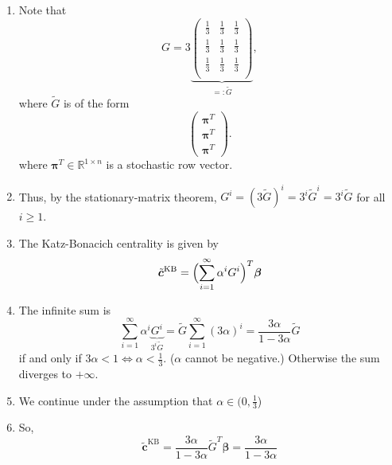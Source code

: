 \begin{parts}
    \begin{solutionorbox}[\boxheight{20}]
        \begin{enumerate}
            \item   Note that 
        \begin{equation*}
            G = 3 \underbrace{\begin{pmatrix}
                \frac{1}{3} & \frac{1}{3} & \frac{1}{3} \\
                \frac{1}{3} & \frac{1}{3} & \frac{1}{3} \\
                \frac{1}{3} & \frac{1}{3} & \frac{1}{3} \\
            \end{pmatrix}}_{=: \tilde G},
        \end{equation*}
        where $\tilde G$ is of the form \begin{equation*}
            \begin{pmatrix}
                \bm \pi^T \\ \bm \pi^T \\ \bm \pi^T
            \end{pmatrix}.
        \end{equation*}
        where $\bm \pi^T \in \mathbb{R}^{1 \times n}$ is a stochastic row vector. 
        \item Thus, by the stationary-matrix theorem, $G^i = (3 \tilde G)^i = 3^i \tilde G^i = 3^i \tilde G$ for all $i \geq 1$.
        \item The Katz-Bonacich centrality is given by \begin{equation*}
            \tilde{\bm c}^{\text{KB}} = \Bigl(\sum_{i=1}^\infty \alpha^i G^i\Bigr)^T \bm \beta
        \end{equation*}
        \item The infinite sum is
        \begin{equation*}
            \sum_{i=1}^\infty \alpha^i \underbrace{G^i}_{3^i \tilde G} = \tilde G \sum_{i = 1}^\infty (3\alpha)^i = \frac{3\alpha}{1-3\alpha} \tilde G
        \end{equation*}
        if and only if $3\alpha < 1 \iff \alpha < \frac{1}{3}$. ($\alpha$ cannot be negative.) Otherwise the sum diverges to $+\infty$.
        \item We continue under the assumption that $\alpha \in (0, \frac{1}{3}$)
        \item So, 
        \begin{equation*}
            \tilde{\bm c}^{\text{KB}} = \frac{3\alpha}{1-3\alpha} \tilde G^T \bm \beta = \frac{3\alpha}{1-3\alpha} 

\end{equation*}
\end{enumerate}
\end{solutionorbox}
\end{parts}
